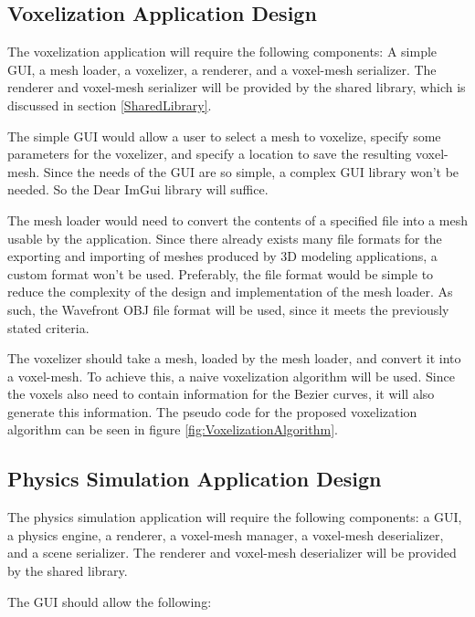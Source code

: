 \subsection{Voxelization Application Design}

The voxelization application will require the following components: A simple GUI, a mesh loader,
a voxelizer, a renderer, and a voxel-mesh serializer. The renderer and voxel-mesh serializer will 
be provided by the shared library, which is discussed in section \ref{SharedLibrary}. 

The simple GUI would allow a user to select a mesh to voxelize, specify some parameters for the 
voxelizer, and specify a location to save the resulting voxel-mesh. Since the needs of the GUI are 
so simple, a complex GUI library won't be needed. So the Dear ImGui library will suffice.

The mesh loader would need to convert the contents of a specified file into a mesh usable by the
application. Since there already exists many file formats for the exporting and importing of meshes
produced by 3D modeling applications, a custom format won't be used. Preferably, the file format 
would be simple to reduce the complexity of the design and implementation of the mesh loader. As
such, the Wavefront OBJ file format will be used, since it meets the previously stated criteria.

The voxelizer should take a mesh, loaded by the mesh loader, and convert it into a voxel-mesh. To
achieve this, a naive voxelization algorithm will be used. Since the voxels also need to contain
information for the Bezier curves, it will also generate this information. The pseudo code for the 
proposed voxelization algorithm can be seen in figure \ref{fig:VoxelizationAlgorithm}.



\subsection{Physics Simulation Application Design}

The physics simulation application will require the following components: a GUI, a physics 
engine, a renderer, a voxel-mesh manager, a voxel-mesh deserializer, and a scene serializer. The 
renderer and voxel-mesh deserializer will be provided by the shared library.

The GUI should allow the following:

